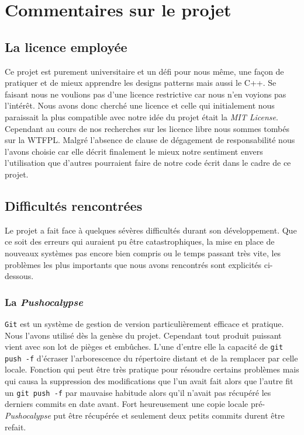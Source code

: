 \documentclass{article}
\newcommand{\info}{\texttt}
\begin{document}
        
        
\section{Commentaires sur le projet}

    \subsection{La licence employée}
    
        Ce projet est purement universitaire et un défi pour nous même, une façon de pratiquer et de mieux apprendre les designs patterns mais aussi le C++. Se faisant nous ne voulions pas d'une licence restrictive car nous n'en voyions pas l'intérêt. Nous avons donc cherché une licence et celle qui initialement nous paraissait la plus compatible avec notre idée du projet était la \emph{MIT License}. Cependant au cours de nos recherches sur les licence libre nous sommes tombés sur la WTFPL. Malgré l'absence de clause de dégagement de responsabilité nous l'avons choisie car elle décrit finalement le mieux notre sentiment envers l'utilisation que d'autres pourraient faire de notre code écrit dans le cadre de ce projet.
    
    \subsection{Difficultés rencontrées}
    
        Le projet a fait face à quelques sévères difficultés durant son développement. Que ce soit des erreurs qui auraient pu être catastrophiques, la mise en place de nouveaux systèmes pas encore bien compris ou le temps passant très vite, les problèmes les plus importants que nous avons rencontrés sont explicités ci-dessous.
    
        \subsubsection{La \emph{Pushocalypse}}
        
            \info{Git} est un système de gestion de version particulièrement efficace et pratique. Nous l'avons utilisé dès la genèse du projet. Cependant tout produit puissant vient avec son lot de pièges et embûches. L'une d'entre elle la capacité de \info{git push -f} d'écraser l'arborescence du répertoire distant et de la remplacer par celle locale. Fonction qui peut être très pratique pour résoudre certains problèmes mais qui causa la suppression des modifications que l'un avait fait alors que l'autre fit un \info{git push -f} par mauvaise habitude alors qu'il n'avait pas récupéré les derniers commits en date avant. Fort heureusement une copie locale pré-\emph{Pushocalypse} put être récupérée et seulement deux petits commits durent être refait.
        
\end{document}
